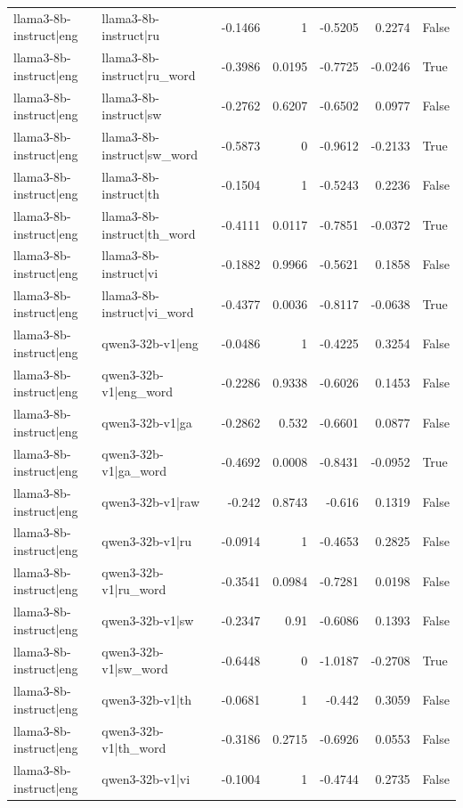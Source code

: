 \begin{table}
\begin{tabular}{l l r r r r l}
llama3-8b-instruct|eng & llama3-8b-instruct|ru & -0.1466 & 1 & -0.5205 & 0.2274 & False \\
llama3-8b-instruct|eng & llama3-8b-instruct|ru_word & -0.3986 & 0.0195 & -0.7725 & -0.0246 & True \\
llama3-8b-instruct|eng & llama3-8b-instruct|sw & -0.2762 & 0.6207 & -0.6502 & 0.0977 & False \\
llama3-8b-instruct|eng & llama3-8b-instruct|sw_word & -0.5873 & 0 & -0.9612 & -0.2133 & True \\
llama3-8b-instruct|eng & llama3-8b-instruct|th & -0.1504 & 1 & -0.5243 & 0.2236 & False \\
llama3-8b-instruct|eng & llama3-8b-instruct|th_word & -0.4111 & 0.0117 & -0.7851 & -0.0372 & True \\
llama3-8b-instruct|eng & llama3-8b-instruct|vi & -0.1882 & 0.9966 & -0.5621 & 0.1858 & False \\
llama3-8b-instruct|eng & llama3-8b-instruct|vi_word & -0.4377 & 0.0036 & -0.8117 & -0.0638 & True \\
llama3-8b-instruct|eng & qwen3-32b-v1|eng & -0.0486 & 1 & -0.4225 & 0.3254 & False \\
llama3-8b-instruct|eng & qwen3-32b-v1|eng_word & -0.2286 & 0.9338 & -0.6026 & 0.1453 & False \\
llama3-8b-instruct|eng & qwen3-32b-v1|ga & -0.2862 & 0.532 & -0.6601 & 0.0877 & False \\
llama3-8b-instruct|eng & qwen3-32b-v1|ga_word & -0.4692 & 0.0008 & -0.8431 & -0.0952 & True \\
llama3-8b-instruct|eng & qwen3-32b-v1|raw & -0.242 & 0.8743 & -0.616 & 0.1319 & False \\
llama3-8b-instruct|eng & qwen3-32b-v1|ru & -0.0914 & 1 & -0.4653 & 0.2825 & False \\
llama3-8b-instruct|eng & qwen3-32b-v1|ru_word & -0.3541 & 0.0984 & -0.7281 & 0.0198 & False \\
llama3-8b-instruct|eng & qwen3-32b-v1|sw & -0.2347 & 0.91 & -0.6086 & 0.1393 & False \\
llama3-8b-instruct|eng & qwen3-32b-v1|sw_word & -0.6448 & 0 & -1.0187 & -0.2708 & True \\
llama3-8b-instruct|eng & qwen3-32b-v1|th & -0.0681 & 1 & -0.442 & 0.3059 & False \\
llama3-8b-instruct|eng & qwen3-32b-v1|th_word & -0.3186 & 0.2715 & -0.6926 & 0.0553 & False \\
llama3-8b-instruct|eng & qwen3-32b-v1|vi & -0.1004 & 1 & -0.4744 & 0.2735 & False \\

\end{tabular}
\end{table}
